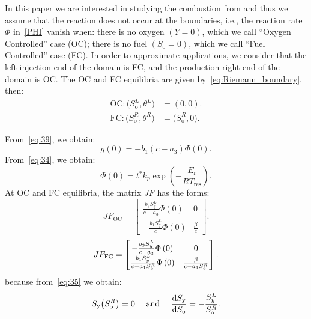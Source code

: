 In this paper we are interested in studying the combustion from and
thus we assume that the reaction does not occur at the boundaries,
i.e., the reaction rate $\Phi$ in~\eqref{PHI} vanish when: there
is no oxygen $(Y=0)$, which we call ``Oxygen Controlled'' case
(OC); there is no fuel $(S_{\text{o}}=0)$, which we call
``Fuel Controlled'' case (FC).
In order to approximate applications, we consider that the left
injection end of the domain is FC, and the production right end of
the domain is OC.
The OC and FC equilibria are given by~\eqref{eq:Riemann_boundary}, then:
\begin{align*}
	\text{OC}:
	\big(S^{L}_{\text{o}},\theta^{L}\big) & =
	\left(0,0\right).                         \\
	\text{FC}:
	\big(S^{R}_{\text{o}},\theta^{R}\big) & =
	\big(S^{R}_{\text{o}},0\big).
\end{align*}

From~\eqref{eq:39}, we obtain:
\setcounter{equation}{47}
\begin{equation}
	g\left(0\right)=
	-b_{1}\left(c-a_{3}\right)\Phi\left(0\right).
\end{equation}
From~\eqref{eq:34}, we obtain:
\begin{equation}
	\Phi\left(0\right)=
	t^{\ast}
	k_{p}
	\exp\left(-\frac{E_{\text{r}}}{RT_{\text{res}}}\right).
\end{equation}
At OC and FC equilibria, the matrix $JF$ has the forms:
\begin{equation}\label{eq:50}
	JF_{\text{OC}}=
	\begin{bmatrix}
		\frac{b_{3}S^{L}_{y}}{c-a_{3}}\Phi\left(0\right) & 0               \\
		-\frac{b_{1}S^{L}_{y}}{c}\Phi\left(0\right)      & \frac{\beta}{c}
	\end{bmatrix}.
\end{equation}
\begin{equation}\label{eq:51}
	JF_{\text{FC}}=
	\begin{bmatrix}
		-\frac{b_{3}S^{L}_{y}}{c-a_{3}}\Phi\left(0\right)                & 0                                     \\[.5\baselineskip]
		\frac{b_{1}S^{L}_{y}}{c-a_{1}S^{R}_{\text{o}}}\Phi\left(0\right) & \frac{\beta}{c-a_{1}S^{R}_{\text{o}}}
	\end{bmatrix}.
\end{equation}
because from~\eqref{eq:35} we obtain:
\begin{equation*}
	S_{\text{y}}
	\big(S^{R}_{\text{o}}\big)=0
	\quad\text{ and }\quad
	\diff{S_{\text{y}}}{S_{\text{o}}}=
	-\frac{S^{L}_{y}}{S^{R}_{\text{o}}}.
\end{equation*}

